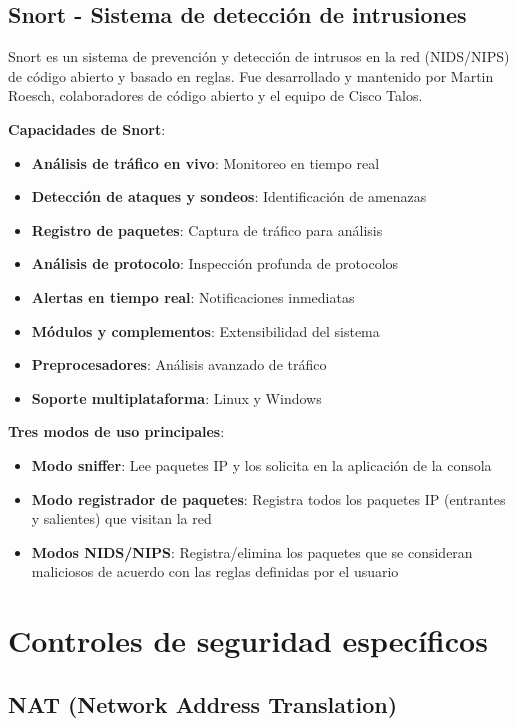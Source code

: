 \subsection{Snort - Sistema de detección de intrusiones}

Snort es un sistema de prevención y detección de intrusos en la red (NIDS/NIPS) de código abierto y basado en reglas. Fue desarrollado y mantenido por Martin Roesch, colaboradores de código abierto y el equipo de Cisco Talos.

\textbf{Capacidades de Snort}:
\begin{itemize}
    \item \textbf{Análisis de tráfico en vivo}: Monitoreo en tiempo real
    \item \textbf{Detección de ataques y sondeos}: Identificación de amenazas
    \item \textbf{Registro de paquetes}: Captura de tráfico para análisis
    \item \textbf{Análisis de protocolo}: Inspección profunda de protocolos
    \item \textbf{Alertas en tiempo real}: Notificaciones inmediatas
    \item \textbf{Módulos y complementos}: Extensibilidad del sistema
    \item \textbf{Preprocesadores}: Análisis avanzado de tráfico
    \item \textbf{Soporte multiplataforma}: Linux y Windows
\end{itemize}

\textbf{Tres modos de uso principales}:
\begin{itemize}
    \item \textbf{Modo sniffer}: Lee paquetes IP y los solicita en la aplicación de la consola
    \item \textbf{Modo registrador de paquetes}: Registra todos los paquetes IP (entrantes y salientes) que visitan la red
    \item \textbf{Modos NIDS/NIPS}: Registra/elimina los paquetes que se consideran maliciosos de acuerdo con las reglas definidas por el usuario
\end{itemize}

\section{Controles de seguridad específicos}

\subsection{NAT (Network Address Translation)}

